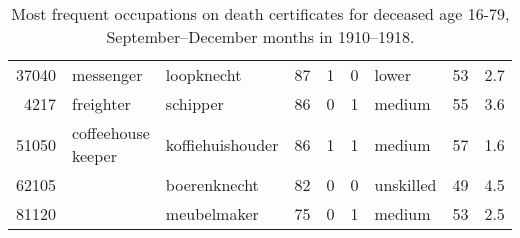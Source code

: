 \begin{table}[h!]
\begin{tabular}{rllrrrlrr}
  37040 & messenger & loopknecht & 87 &  1 &  0 & lower & 53 & 2.7 \\ 
  4217 & freighter & schipper & 86 &  0 &  1 & medium & 55 & 3.6 \\ 
  51050 & coffeehouse keeper & koffiehuishouder & 86 &  1 &  1 & medium & 57 & 1.6 \\ 
  62105 &  & boerenknecht & 82 &  0 &  0 & unskilled & 49 & 4.5 \\ 
  81120 &  & meubelmaker & 75 &  0 &  1 & medium & 53 & 2.5 \\ 
   \hline
\end{tabular}
\caption{Most frequent occupations on death certificates for deceased age 16-79, September--December months in 1910--1918.} 
\label{tab:topoccs_selected}
\end{table}
